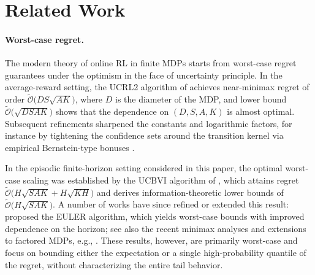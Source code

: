 \documentclass[11pt]{article}
\begin{document}
\section{Related Work}

\paragraph{Worst-case regret.}
The modern theory of online RL in finite MDPs starts from worst-case regret guarantees under the optimism in the face of uncertainty principle.  
In the average-reward setting, the UCRL2 algorithm of \citet{jaksch2010near} achieves near-minimax regret of order $\widetilde{\mathcal O}\!\big(DS\sqrt{AK}\big)$, where $D$ is the diameter of the MDP, and lower bound $\widetilde{\mathcal O}\!\big(\sqrt{DSAK}\big)$ shows that the dependence on $(D,S,A,K)$ is almost optimal.  
Subsequent refinements sharpened the constants and logarithmic factors, for instance by tightening the confidence sets around the transition kernel via empirical Bernstein-type bonuses \citep{bourel2020tightening,fruit2020improved}.


In the episodic finite-horizon setting considered in this paper, the optimal worst-case scaling was established by the UCBVI algorithm of \citet{azar2017minimax}, which attains regret $\widetilde{\mathcal O}\!\big(H\sqrt{SAK} + H\sqrt{KH}\big)$ and derives information-theoretic lower bounds of $\widetilde{\mathcal O}\!\big(H\sqrt{SAK}\big)$.  
A number of works have since refined or extended this result: \citet{efroni2019tight} proposed the EULER algorithm, which yields worst-case bounds with improved dependence on the horizon; see also the recent minimax analyses and extensions to factored MDPs, e.g., \citet{tian2020towards}.  
These results, however, are primarily worst-case and focus on bounding either the expectation or a single high-probability quantile of the regret, without characterizing the entire tail behavior.
\end{document}
